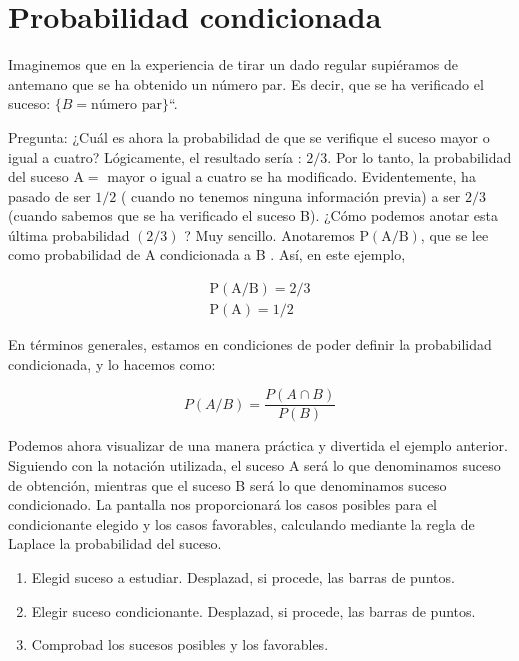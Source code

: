 \documentclass[
  a4paper,
  DIV=11,
  numbers=noendperiod]{scrreprt}
\providecommand{\tightlist}{%
  \setlength{\itemsep}{0pt}\setlength{\parskip}{0pt}}\usepackage{longtable,booktabs,array}
\begin{document}
\section{Probabilidad condicionada}\label{probabilidad-condicionada}

Imaginemos que en la experiencia de tirar un dado regular supiéramos de
antemano que se ha obtenido un número par. Es decir, que se ha
verificado el suceso: \(\{B = \mbox{número par}\}\)``.

Pregunta: ¿Cuál es ahora la probabilidad de que se verifique el suceso
mayor o igual a cuatro? Lógicamente, el resultado sería : \(2 / 3\). Por
lo tanto, la probabilidad del suceso \(\mathrm{A}=\) mayor o igual a
cuatro se ha modificado. Evidentemente, ha pasado de ser \(1 / 2\) (
cuando no tenemos ninguna información previa) a ser \(2 / 3\) (cuando
sabemos que se ha verificado el suceso B). ¿Cómo podemos anotar esta
última probabilidad \((2 / 3)\) ? Muy sencillo. Anotaremos
\(\mathrm{P}(\mathrm{A} / \mathrm{B})\), que se lee como probabilidad de
A condicionada a B . Así, en este ejemplo,

\[
\begin{gathered}
\mathrm{P}(\mathrm{A} / \mathrm{B})=2 / 3 \\
\mathrm{P}(\mathrm{A})=1 / 2
\end{gathered}
\]

En términos generales, estamos en condiciones de poder definir la
probabilidad condicionada, y lo hacemos como:

\[
P(A / B)=\frac{P(A \cap B)}{P(B)}
\]

Podemos ahora visualizar de una manera práctica y divertida el ejemplo
anterior. Siguiendo con la notación utilizada, el suceso A será lo que
denominamos suceso de obtención, mientras que el suceso B será lo que
denominamos suceso condicionado. La pantalla nos proporcionará los casos
posibles para el condicionante elegido y los casos favorables,
calculando mediante la regla de Laplace la probabilidad del suceso.

\begin{enumerate}
\def\labelenumi{\arabic{enumi})}
\tightlist
\item
  Elegid suceso a estudiar. Desplazad, si procede, las barras de puntos.
\item
  Elegir suceso condicionante. Desplazad, si procede, las barras de
  puntos.
\item
  Comprobad los sucesos posibles y los favorables.
\end{enumerate}
\end{document}
